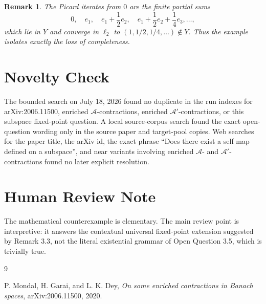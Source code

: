 \documentclass[11pt]{article}
\newtheorem{remark}{Remark}
\newcommand{\A}{\mathcal A}
\newcommand{\Aprime}{\mathcal A'}
\newcommand{\ellTwo}{\ell_2}
\begin{document}
\begin{remark}
The Picard iterates from \(0\) are the finite partial sums
\[
  0,\quad e_1,\quad e_1+\frac12 e_2,\quad
  e_1+\frac12 e_2+\frac14 e_3,\ldots,
\]
which lie in \(Y\) and converge in \(\ellTwo\) to
\((1,1/2,1/4,\ldots)\notin Y\).  Thus the example isolates exactly the loss of
completeness.
\end{remark}

\section*{Novelty Check}

The bounded search on July 18, 2026 found no duplicate in the run indexes for
arXiv:2006.11500, enriched \(\A\)-contractions, enriched
\(\Aprime\)-contractions, or this subspace fixed-point question.  A local
source-corpus search found the exact open-question wording only in the source
paper and target-pool copies.  Web searches for the paper title, the arXiv id,
the exact phrase ``Does there exist a self map defined on a subspace'', and
near variants involving enriched \(\A\)- and \(\Aprime\)-contractions found no
later explicit resolution.

\section*{Human Review Note}

The mathematical counterexample is elementary.  The main review point is
interpretive: it answers the contextual universal fixed-point extension
suggested by Remark 3.3, not the literal existential grammar of Open Question
3.5, which is trivially true.

\begin{thebibliography}{9}

P. Mondal, H. Garai, and L. K. Dey,
\emph{On some enriched contractions in Banach spaces},
arXiv:2006.11500, 2020.

\end{thebibliography}
\end{document}
